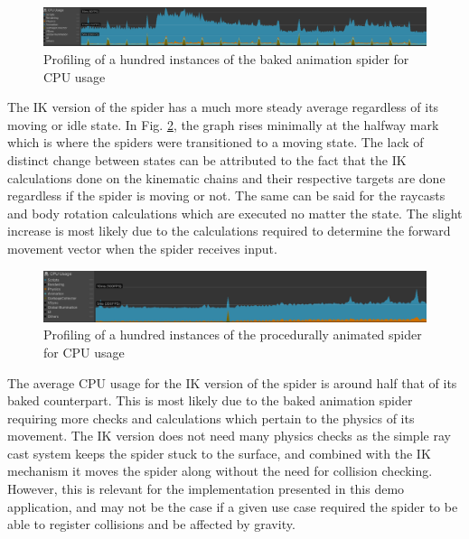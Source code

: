 \begin{figure}[h!]
    \centering
    \captionsetup{justification=centering}
    \includegraphics[width=\textwidth]{grafika/pr_sp_b.eps}
    \caption{Profiling of a hundred instances of the baked animation spider for
    CPU usage}
    \label{fig:pr_sp_b}
\end{figure}

The IK version of the spider has a much more steady average regardless of its
moving or idle state. In Fig. \ref{fig:pr_sp_ik}, the graph rises minimally at the
halfway mark which is where the spiders were transitioned to a moving state.
The lack of distinct change between states can be attributed to the fact that
the IK calculations done on the kinematic chains and their respective targets
are done regardless if the spider is moving or not. The same can be said for the
raycasts and body rotation calculations which are executed no matter the state.
The slight increase is most likely due to the calculations required to determine
the forward movement vector when the spider receives input. 

\begin{figure}[h!]
    \centering
    \captionsetup{justification=centering}
    \includegraphics[width=\textwidth]{grafika/pr_sp_ik.eps}
    \caption{Profiling of a hundred instances of the procedurally animated
    spider for CPU usage}
    \label{fig:pr_sp_ik}
\end{figure}

The average CPU usage for the IK version of the spider is around half that of its
baked counterpart. This is most likely due to the baked animation spider
requiring more checks and calculations which pertain to the physics of its
movement. The IK version does not need many physics checks as the simple ray
cast system keeps the spider stuck to the surface, and combined with the IK
mechanism it moves the spider along without the need for collision checking.
However, this is relevant for the implementation presented in this demo
application, and may not be the case if a given use case required the spider to
be able to register collisions and be affected by gravity.

